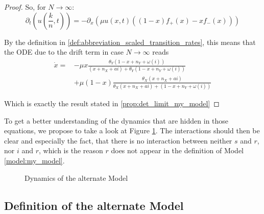 \documentclass[12pt,a4paper,twoside]{article}
\begin{document}
\begin{proof}
	So, for $N \rightarrow \infty$:
	\begin{equation}
	\partial_t \left(u\left(\frac{k}{n}, t\right)\right) = -\partial_x\left(\mu u(x,t)\left((1-x)f_+(x) - xf_-(x)\right)\right)
	\end{equation}
	
	By the definition in \eqref{def:abbreviation_scaled_transition_rates}, this means that the ODE due to the drift term in case $N \rightarrow \infty$ reads 
	\begin{align*}
	\dot{x} = &-\mu x\frac{\theta_Y(1-x+n_Y+\omega\left(i\right))}{(x+n_X+ai) + \theta_Y(1-x+n_Y+\omega\left(i\right))}\\
	\qquad&+ \mu \left(1-x\right)\frac{\theta_X (x+ n_X+ ai)}{\theta_X (x + n_X + ai) + (1-x + n_Y + \omega\left(i\right))}
	\end{align*}
	
	Which is exactly the result stated in \eqref{prop:det_limit_my_model}
\end{proof}

To get a better understanding of the dynamics that are hidden in those equations, we propose to take a look at Figure \ref{fig:my_model}. The interactions should then be clear and especially the fact, that there is no interaction between neither $s$ and $r$, nor $i$ and $r$, which is the reason $r$ does not appear in the definition of Model \ref{model:my_model}. 

\begin{figure}[h!]
	\centering
	\caption{Dynamics of the alternate Model}
	\label{fig:my_model}
	\def\svgwidth{450pt}
	
\end{figure}

\subsection{Definition of the alternate Model}
\end{document}
